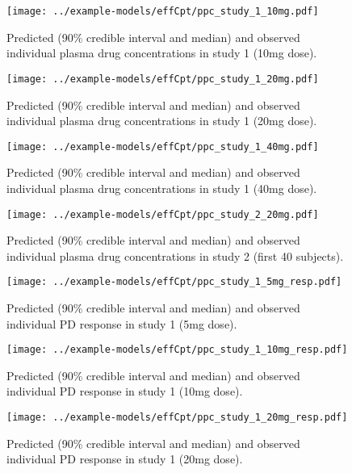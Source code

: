 \documentclass[12pt, reqno, oneside]{amsbook}
\numberwithin{equation}{chapter}
\numberwithin{figure}{chapter}
\numberwithin{table}{chapter}
\theoremstyle{remark}
\begin{document}
\begin{figure}[htbp]
\centering
\texttt{[image: ../example-models/effCpt/ppc\_study\_1\_10mg.pdf]}
\caption{\label{effcpt_ppc_10mg}Predicted (90\% credible interval and median) and observed individual plasma drug concentrations in study 1 (10mg dose).}
\end{figure}

\begin{figure}[htbp]
\centering
\texttt{[image: ../example-models/effCpt/ppc\_study\_1\_20mg.pdf]}
\caption{\label{effcpt_ppc_20mg}Predicted (90\% credible interval and median) and observed individual plasma drug concentrations in study 1 (20mg dose).}
\end{figure}

\begin{figure}[htbp]
\centering
\texttt{[image: ../example-models/effCpt/ppc\_study\_1\_40mg.pdf]}
\caption{\label{effcpt_ppc_40mg}Predicted (90\% credible interval and median) and observed individual plasma drug concentrations in study 1 (40mg dose).}
\end{figure}

\begin{figure}[htbp]
\centering
\texttt{[image: ../example-models/effCpt/ppc\_study\_2\_20mg.pdf]}
\caption{\label{effcpt_ppc_study_2_20mg}Predicted (90\% credible interval and median) and observed individual plasma drug concentrations in study 2 (first 40 subjects).}
\end{figure}

\begin{figure}[htbp]
\centering
\texttt{[image: ../example-models/effCpt/ppc\_study\_1\_5mg\_resp.pdf]}
\caption{\label{effcpt_ppc_resp_5mg}Predicted (90\% credible interval and median) and observed individual PD response in study 1 (5mg dose).}
\end{figure}

\begin{figure}[htbp]
\centering
\texttt{[image: ../example-models/effCpt/ppc\_study\_1\_10mg\_resp.pdf]}
\caption{\label{effcpt_ppc_resp_10mg}Predicted (90\% credible interval and median) and observed individual PD response in study 1 (10mg dose).}
\end{figure}

\begin{figure}[htbp]
\centering
\texttt{[image: ../example-models/effCpt/ppc\_study\_1\_20mg\_resp.pdf]}
\caption{\label{effcpt_ppc_resp_20mg}Predicted (90\% credible interval and median) and observed individual PD response in study 1 (20mg dose).}
\end{figure}
\end{document}
